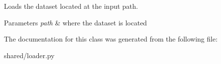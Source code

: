 Loads the dataset located at the input path. 


\begin{DoxyParams}{Parameters}
{\em path} & where the dataset is located \\
\hline
\end{DoxyParams}


The documentation for this class was generated from the following file\+:\begin{DoxyCompactItemize}
\item 
shared/loader.\+py\end{DoxyCompactItemize}
